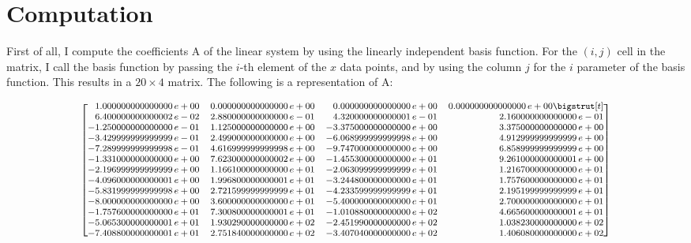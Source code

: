 \documentclass{article}
\begin{document}
\section{Computation}
First of all, I compute the coefficients A of the linear system by using the linearly independent basis function. For the $(i, j)$ cell in the matrix, I call the basis function by passing the $i$-th element of the $x$ data points, and by using the column $j$ for the $i$ parameter of the basis function. This results in a $20\times4$ matrix. The following is a representation of A:
\begin{adjustwidth}{-2em}{-2em}
    \[ \medmath{\begin{bmatrix*}[r]
1.000000000000000\,e+00 & 0.000000000000000\,e+00 & 0.000000000000000\,e+00 & 0.000000000000000\,e+00 \bigstrut[t]\\
6.400000000000002\,e-02 & 2.880000000000000\,e-01 & 4.320000000000001\,e-01 & 2.160000000000000\,e-01 \\
-1.250000000000000\,e-01 & 1.125000000000000\,e+00 & -3.375000000000000\,e+00 & 3.375000000000000\,e+00 \\
-3.429999999999999\,e-01 & 2.499000000000000\,e+00 & -6.068999999999998\,e+00 & 4.912999999999999\,e+00 \\
-7.289999999999998\,e-01 & 4.616999999999998\,e+00 & -9.747000000000000\,e+00 & 6.858999999999999\,e+00 \\
-1.331000000000000\,e+00 & 7.623000000000002\,e+00 & -1.455300000000000\,e+01 & 9.261000000000001\,e+00 \\
-2.196999999999999\,e+00 & 1.166100000000000\,e+01 & -2.063099999999999\,e+01 & 1.216700000000000\,e+01 \\
-4.096000000000001\,e+00 & 1.996800000000001\,e+01 & -3.244800000000000\,e+01 & 1.757600000000000\,e+01 \\
-5.831999999999998\,e+00 & 2.721599999999999\,e+01 & -4.233599999999999\,e+01 & 2.195199999999999\,e+01 \\
-8.000000000000000\,e+00 & 3.600000000000000\,e+01 & -5.400000000000000\,e+01 & 2.700000000000000\,e+01 \\
-1.757600000000000\,e+01 & 7.300800000000001\,e+01 & -1.010880000000000\,e+02 & 4.665600000000001\,e+01 \\
-5.065300000000001\,e+01 & 1.930290000000000\,e+02 & -2.451990000000000\,e+02 & 1.038230000000000\,e+02 \\
-7.408800000000001\,e+01 & 2.751840000000000\,e+02 & -3.407040000000000\,e+02 & 1.406080000000000\,e+02 \\

\end{bmatrix*}}\]
\end{adjustwidth}
\end{document}
